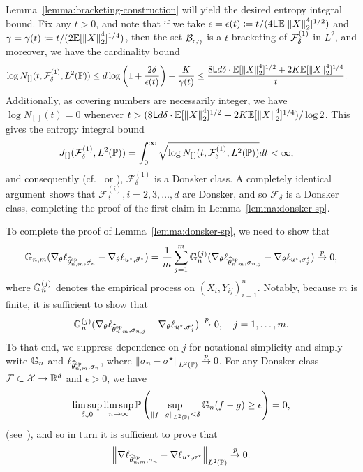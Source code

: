 Lemma~\ref{lemma:bracketing-construction} will yield the desired entropy
integral bound. Fix any $t > 0$, and note that if we take $\epsilon
=\epsilon(t) \coloneqq t / (4 \mathsf{L} \mathbb{E}[\left\|{X}\right\|_2^4]^{1/2})$ and $\gamma =
\gamma(t) \coloneqq t / (2 \mathbb{E}[\left\|{X}\right\|_2^4]^{1/4})$, then the set
$\mathcal{B}_{\epsilon, \gamma}$ is a $t$-bracketing of $\mathcal{F}_\delta^{(1)}$ in
$L^2$, and moreover, we have the cardinality bound
\begin{align*}
	\log N_{[\,]}(t, \mathcal{F}_{\delta}^{(1)} , L^2(\mathbb{P}))
	&
	\leq d \log \left(1 + \frac{2 \delta}{\epsilon(t)}\right)
	+ \frac{K}{\gamma(t)}
	\leq \frac{8\mathsf{L} d \delta \cdot \mathbb{E} [\left\|{X}\right\|_2^4]^{1/2}
		+ 2K \mathbb{E}[\left\|{X}\right\|_2^4]^{1/4}}{t}.
\end{align*}
Additionally, as covering numbers are necessarily integer,
we have $\log N_{[\,]}(t) = 0$
whenever
$t > (8\mathsf{L} d \delta \cdot \mathbb{E} [\left\|{X}\right\|_2^4]^{1/2}
+ 2K \mathbb{E}[\left\|{X}\right\|_2^4]^{1/4}) / \log 2$.
This gives the entropy integral bound
\begin{align*}
	J_{[\, ]}(\mathcal{F}_{\delta}^{(1)}, L^2(\mathbb{P}))
	& = \int_0^\infty \sqrt{\log N_{[\,]}(t ,\mathcal{F}_{\delta}^{(1)} ,
		L^2(\mathbb{P}))} d t < \infty,
\end{align*}
and consequently (cf.~\cite[Thm.~19.5]{VanDerVaart98} or
\cite[Ch.~2.5.2]{VanDerVaartWe96}), $\mathcal{F}_{\delta}^{(1)}$ is a
Donsker class.  A completely identical argument shows that
$\mathcal{F}_{\delta}^{(i)}, i=2,3,\dots, d$ are Donsker, and so
$\mathcal{F}_\delta$ is a Donsker class, completing the proof of the
first claim in Lemma~\ref{lemma:donsker-sp}.

To complete the proof of Lemma~\ref{lemma:donsker-sp},
we need to show that
\begin{align*}
	\mathbb{G}_{n,m} (\nabla_\theta\ell_{\widehat{\theta}^{\textup{sp}}_{n,m}, \vec{\sigma}_n}
	- \nabla_\theta\ell_{u^\star, \vec{\sigma}^\star})
	=
	\frac{1}{m}
	\sum_{j = 1}^m
	\mathbb{G}_n^{(j)} (\nabla_\theta\ell_{\widehat{\theta}^{\textup{sp}}_{n,m}, \sigma_{n,j}}
	- \nabla_\theta \ell_{u^\star, \sigma^\star_j})
	\stackrel{p}{\rightarrow} 0,
\end{align*}
where $\mathbb{G}_n^{(j)}$ denotes the empirical process on
$(X_i, Y_{ij})_{i=  1}^n$. Notably, because $m$ is finite, it is sufficient
to show that
\begin{equation*}
	\mathbb{G}_n^{(j)} (\nabla_\theta\ell_{\widehat{\theta}^{\textup{sp}}_{n,m}, \sigma_{n,j}}
	- \nabla_\theta \ell_{u^\star, \sigma^\star_j})
	\stackrel{p}{\rightarrow} 0,
	~~~
	j = 1, \ldots, m.
\end{equation*}
To that end, we suppress dependence on $j$ for notational
simplicity and simply write $\mathbb{G}_n$ and $\ell_{\widehat{\theta}^{\textup{sp}}_{n,m}, \sigma_n}$, where
$\left\|{\sigma_n - \sigma^\star}\right\|_{L^2(\mathbb{P})} \stackrel{p}{\rightarrow} 0$.
For any Donsker class $\mathcal{F} \subset \mathcal{X} \to \mathbb{R}^d$ and
$\epsilon > 0$,
we have
\begin{equation*}
	\limsup_{\delta \downarrow 0}
	\limsup_{n \to \infty}
	\mathbb{P}\left(\sup_{\left\|{f - g}\right\|_{L^2(\mathbb{P})} \le \delta}
	\mathbb{G}_n(f - g) \ge \epsilon\right) = 0,
\end{equation*}
(see~\cite[Thm.~3.7.31]{GineNi21}), and so in turn it is sufficient to prove
that
\begin{equation}
	\label{eqn:ltwo-p-convergence-sp}
	\left\|{\nabla \ell_{\widehat{\theta}^{\textup{sp}}_{n,m}, \sigma_n} - \nabla\ell_{u^\star, \sigma^\star}}\right\|_{L^2(\mathbb{P})}
	\stackrel{p}{\rightarrow} 0.
\end{equation}

